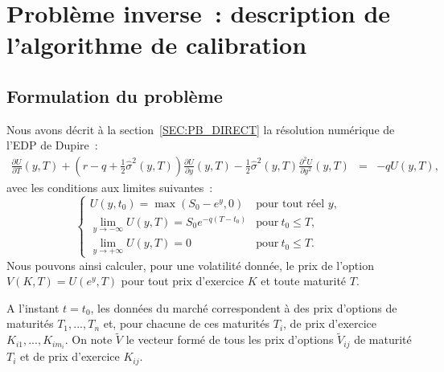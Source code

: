 \section{Probl\`eme inverse~: description de l'algorithme de 
calibration}
\label{SEC:PB_INVERSE}

\subsection{Formulation du probl\`eme}

Nous avons d\'ecrit \`a la section~\ref{SEC:PB_DIRECT} la 
r\'esolution num\'erique de l'EDP de Dupire~: 
\begin{eqnarray*}
\frac{\partial U}{\partial T}(y,T) + 
(r-q+\frac{1}{2}\hat{\sigma}^2(y,T))
\frac{\partial U}{\partial y}(y,T) - 
\frac{1}{2}\hat{\sigma}^2(y,T)
\frac{\partial^2 U}{\partial y^2}(y,T) &=& -qU(y,T),
\end{eqnarray*}
avec les conditions aux limites suivantes~: 
$$
\left \{
\begin{array}{ll}
U(y,t_0) = \max(S_0-e^y,0)& \text{pour tout r\'eel $y$},\\
\lim_{y \rightarrow -\infty}U(y,T) = S_0e^{-q(T-t_0)} & 
\text{pour}~ t_0\leq T,\\
\lim_{y \rightarrow +\infty} U(y,T) = 0 & 
\text{pour}~ t_0\leq T.
\end{array}
\right .
$$
Nous pouvons ainsi calculer, pour une volatilit\'e donn\'ee, le 
prix de l'option $V(K,T) = U(e^y,T)$ pour tout prix d'exercice 
$K$ et toute maturit\'e $T$. 

A l'instant $t=t_0$, les donn\'ees du march\'e correspondent \`a 
des prix d'options de maturit\'es $T_1,...,T_n$ et, pour chacune 
de ces maturit\'es $T_i$, de prix d'exercice 
$K_{i1},...,K_{im_i}$. On note $\tilde{V}$ le vecteur form\'e de 
tous les prix d'options $\tilde{V}_{ij}$ de maturit\'e $T_i$ et 
de prix d'exercice $K_{ij}$.

